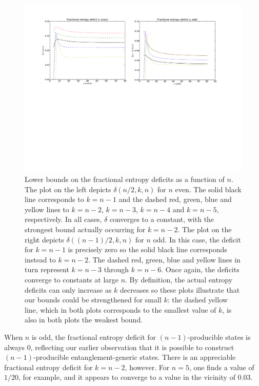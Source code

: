 \documentclass[12pt]{article}
\numberwithin{equation}{section}
\begin{document}
\begin{figure}
\centering
\includegraphics[keepaspectratio,width=1.0\linewidth]{entropy-deficits.pdf}
\caption{Lower bounds on the fractional entropy deficits as a function of $n$. The plot on the left depicts $\delta(n/2,k,n)$ for $n$ even. The solid black line corresponds to $k=n-1$ and the dashed red, green, blue and yellow lines to $k=n-2$, $k=n-3$, $k=n-4$ and $k=n-5$, respectively. In all cases, $\delta$ converges to a constant, with the strongest bound actually occurring for $k=n-2$. The plot on the right depicts $\delta((n-1)/2,k,n)$ for $n$ odd. In this case, the deficit for $k=n-1$ is precisely zero so the solid black line corresponds instead to $k=n-2$. The dashed red, green, blue and yellow lines in turn represent $k=n-3$ through $k=n-6$. Once again, the deficits converge to constants at large $n$. By definition, the actual entropy deficits can only increase as $k$ decreases so these plots illustrate that our bounds could be strengthened for small $k$: the dashed yellow line, which in both plots corresponds to the smallest value of $k$, is also in both plots the weakest bound.}
\label{fig:entropy-deficits}
\end{figure}

When $n$ is odd, the fractional entropy deficit for $(n-1)$-producible states is always 0, reflecting our earlier observation that it is possible to construct $(n-1)$-producible entanglement-generic states. There is an appreciable fractional entropy deficit for $k=n-2$, however. For $n=5$, one finds a value of $1/20$, for example, and it appears to converge to a value in the vicinity of $0.03$.
\end{document}
